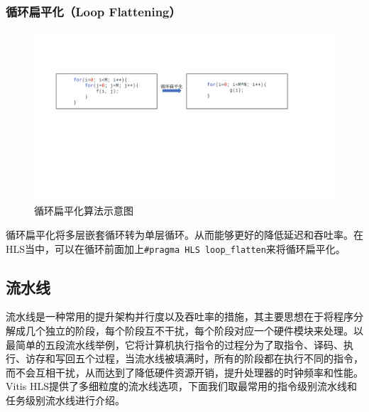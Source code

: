 \subsubsection{循环扁平化（Loop Flattening）}
\begin{figure}[htbp]
    \centering
    \includegraphics[width=\linewidth]{figures/loop flattening.pdf}
    \caption{循环扁平化算法示意图}
    \label{fig:loop_flattening}
\end{figure}
循环扁平化将多层嵌套循环转为单层循环。从而能够更好的降低延迟和吞吐率。在HLS当中，可以在循环前面加上\verb|#pragma HLS loop_flatten|来将循环扁平化。
\subsection{流水线}

流水线是一种常用的提升架构并行度以及吞吐率的措施，其主要思想在于将程序分解成几个独立的阶段，每个阶段互不干扰，每个阶段对应一个硬件模块来处理。以最简单的五段流水线举例，它将计算机执行指令的过程分为了取指令、译码、执行、访存和写回五个过程，当流水线被填满时，所有的阶段都在执行不同的指令，而不会互相干扰，从而达到了降低硬件资源开销，提升处理器的时钟频率和性能。Vitis HLS提供了多细粒度的流水线选项，下面我们取最常用的指令级别流水线和任务级别流水线进行介绍。


